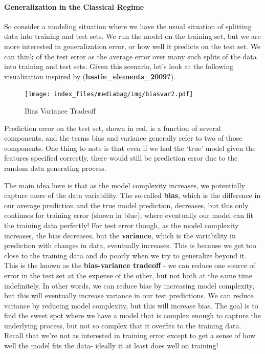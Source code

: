 \documentclass[
  letterpaper,
]{krantz}
\let\oldparagraph\paragraph
\renewcommand{\paragraph}[1]{\oldparagraph{#1}\mbox{}}
\begin{document}
\paragraph{Generalization in the Classical
Regime}\label{generalization-in-the-classical-regime}

So consider a modeling situation where we have the usual situation of
splitting data into training and test sets. We run the model on the
training set, but we are more interested in generalization error, or how
well it predicts on the test set. We can think of the test error as the
average error over many such splits of the data into training and test
sets. Given this scenario, let's look at the following visualization
inspired by (\textbf{hastie\_elements\_2009?}).

\begin{figure}

{\centering \texttt{[image: index\_files/mediabag/img/biasvar2.pdf]}

}

\caption{\label{fig-bias-variance}Bias Variance Tradeoff}

\end{figure}

Prediction error on the test set, shown in red, is a function of several
components, and the terms bias and variance generally refer to two of
those components. One thing to note is that even if we had the `true'
model given the features specified correctly, there would still be
prediction error due to the random data generating process.

The main idea here is that as the model complexity increases, we
potentially capture more of the data variability. The so-called
\textbf{bias}, which is the difference in our average prediction and the
true model prediction, decreases, but this only continues for training
error (shown in blue), where eventually our model can fit the training
data perfectly! For test error though, as the model complexity
increases, the bias decreases, but the \textbf{variance}, which is the
variability in prediction with changes in data, eventually increases.
This is because we get too close to the training data and do poorly when
we try to generalize beyond it. This is the known as the
\textbf{bias-variance tradeoff} - we can reduce one source of error in
the test set at the expense of the other, but not both at the same time
indefinitely. In other words, we can reduce bias by increasing model
complexity, but this will eventually increase variance in our test
predictions. We can reduce variance by reducing model complexity, but
this will increase bias. The goal is to find the sweet spot where we
have a model that is complex enough to capture the underlying process,
but not so complex that it overfits to the training data. Recall that
we're not as interested in training error except to get a sense of how
well the model fits the data- ideally it at least does well on training!
\end{document}
